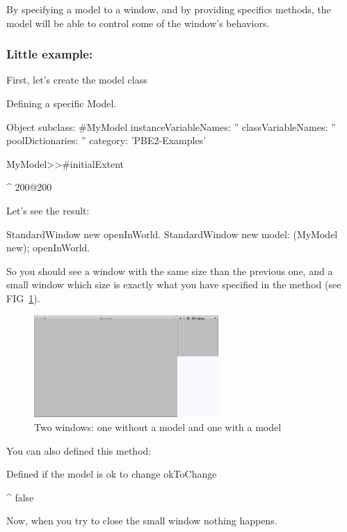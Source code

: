 \documentclass[a4paper,10pt,twoside]{book}
\begin{document}
By specifying a model to a window, and by providing specifics methods, the model will be able to control some of the window's behaviors.

\subsubsection{Little example:}

First, let's create the model class

\begin{classdef}{Defining a specific Model.}

Object subclass: #MyModel
	instanceVariableNames: ''
	classVariableNames: ''
	poolDictionaries: ''
	category: 'PBE2-Examples'

MyModel>>#initialExtent

	^ 200@200
\end{classdef}

Let's see the result:

\begin{code}{}
StandardWindow new openInWorld.
StandardWindow new model: (MyModel new); openInWorld.
\end{code}

So you should see a window with the same size than the previous one, and a small window which size is exactly what you have specified in the method  (see FIG~\ref{fig:withAndWithoutModel}).

\begin{figure}[ht]\centering
	\includegraphics[width=7cm]{WithAndWithoutModel}
	\caption{Two windows: one without a model and one with a model}
	\label{fig:withAndWithoutModel}
\end{figure}

You can also defined this method:

\begin{method}{Defined if the model is ok to change}
okToChange

	^ false
\end{method}

Now, when you try to close the small window nothing happens.
\end{document}
